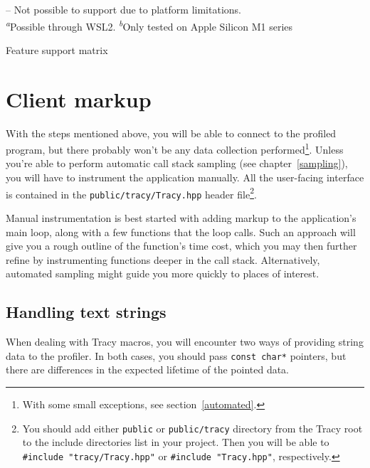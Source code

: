 \documentclass[hidelinks,titlepage,a4paper,twoside]{article}
\begin{document}
\begin{table}[h]
\vspace{1em}
\faPoo{} -- Not possible to support due to platform limitations. \\
\textsuperscript{\emph{a}}Possible through WSL2.
\textsuperscript{\emph{b}}Only tested on Apple Silicon M1 series
\caption{Feature support matrix}
\label{featuretable}
\end{table}

\section{Client markup}
\label{client}

With the steps mentioned above, you will be able to connect to the profiled program, but there probably won't be any data collection performed\footnote{With some small exceptions, see section~\ref{automated}.}. Unless you're able to perform automatic call stack sampling (see chapter~\ref{sampling}), you will have to instrument the application manually. All the user-facing interface is contained in the \texttt{public/tracy/Tracy.hpp} header file\footnote{You should add either \texttt{public} or \texttt{public/tracy} directory from the Tracy root to the include directories list in your project. Then you will be able to \texttt{\#include "tracy/Tracy.hpp"} or \texttt{\#include "Tracy.hpp"}, respectively.}.

Manual instrumentation is best started with adding markup to the application's main loop, along with a few functions that the loop calls. Such an approach will give you a rough outline of the function's time cost, which you may then further refine by instrumenting functions deeper in the call stack. Alternatively, automated sampling might guide you more quickly to places of interest.

\subsection{Handling text strings}
\label{textstrings}

When dealing with Tracy macros, you will encounter two ways of providing string data to the profiler. In both cases, you should pass \texttt{const char*} pointers, but there are differences in the expected lifetime of the pointed data.
\end{document}
